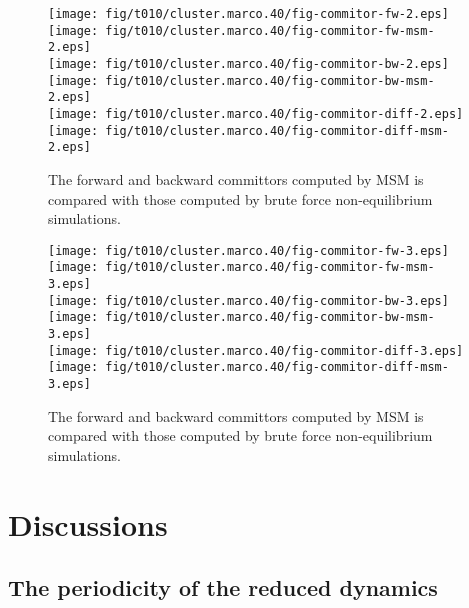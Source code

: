 \documentclass[aps, pre, preprint,unsortedaddress,a4paper,onecolumn]{revtex4}
\begin{document}
\begin{figure}
  \centering
  \texttt{[image: fig/t010/cluster.marco.40/fig-commitor-fw-2.eps]}
  \texttt{[image: fig/t010/cluster.marco.40/fig-commitor-fw-msm-2.eps]}\\
  \texttt{[image: fig/t010/cluster.marco.40/fig-commitor-bw-2.eps]}
  \texttt{[image: fig/t010/cluster.marco.40/fig-commitor-bw-msm-2.eps]}\\
  \texttt{[image: fig/t010/cluster.marco.40/fig-commitor-diff-2.eps]}
  \texttt{[image: fig/t010/cluster.marco.40/fig-commitor-diff-msm-2.eps]}
  \caption{The forward and backward committors computed by MSM is compared with those computed by brute force non-equilibrium simulations.}  
  \label{fig:num-4}
\end{figure}

\begin{figure}
  \centering
  \texttt{[image: fig/t010/cluster.marco.40/fig-commitor-fw-3.eps]}
  \texttt{[image: fig/t010/cluster.marco.40/fig-commitor-fw-msm-3.eps]}\\
  \texttt{[image: fig/t010/cluster.marco.40/fig-commitor-bw-3.eps]}
  \texttt{[image: fig/t010/cluster.marco.40/fig-commitor-bw-msm-3.eps]}\\
  \texttt{[image: fig/t010/cluster.marco.40/fig-commitor-diff-3.eps]}
  \texttt{[image: fig/t010/cluster.marco.40/fig-commitor-diff-msm-3.eps]}
  \caption{The forward and backward committors computed by MSM is compared with those computed by brute force non-equilibrium simulations.}  
  \label{fig:num-5}
\end{figure}


\section{Discussions}
\subsection{The periodicity of the reduced dynamics}
\end{document}
